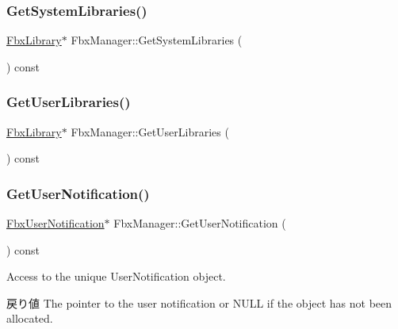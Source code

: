 \subsubsection{\texorpdfstring{Get\+System\+Libraries()}{GetSystemLibraries()}}
{\footnotesize\ttfamily \hyperlink{class_fbx_library}{Fbx\+Library}$\ast$ Fbx\+Manager\+::\+Get\+System\+Libraries (\begin{DoxyParamCaption}{ }\end{DoxyParamCaption}) const}

\mbox{\label{class_fbx_manager_a9eda0b9c72884386d1dedfd80d34735a}} 
\subsubsection{\texorpdfstring{Get\+User\+Libraries()}{GetUserLibraries()}}
{\footnotesize\ttfamily \hyperlink{class_fbx_library}{Fbx\+Library}$\ast$ Fbx\+Manager\+::\+Get\+User\+Libraries (\begin{DoxyParamCaption}{ }\end{DoxyParamCaption}) const}

\mbox{\label{class_fbx_manager_a9ab42b94660c722ec957188c0f5c0cbe}} 
\subsubsection{\texorpdfstring{Get\+User\+Notification()}{GetUserNotification()}}
{\footnotesize\ttfamily \hyperlink{class_fbx_user_notification}{Fbx\+User\+Notification}$\ast$ Fbx\+Manager\+::\+Get\+User\+Notification (\begin{DoxyParamCaption}{ }\end{DoxyParamCaption}) const}

Access to the unique User\+Notification object. \begin{DoxyReturn}{戻り値}
The pointer to the user notification or {\ttfamily N\+U\+LL} {\ttfamily if} the object has not been allocated. 
\end{DoxyReturn}
\mbox{\label{class_fbx_manager_ac137167b0408326c6dbe1ce14004e800}} 
